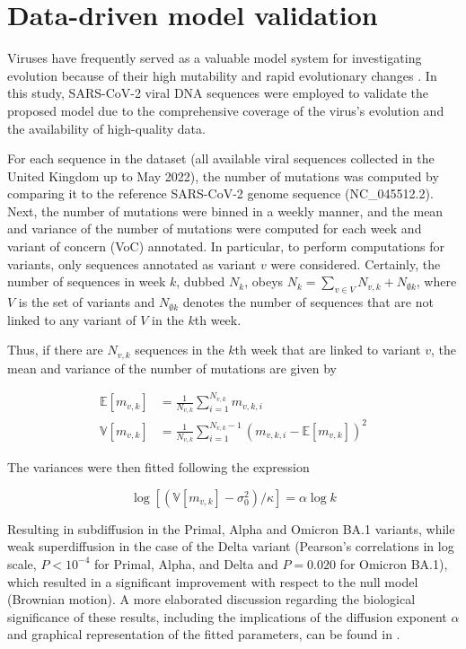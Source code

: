 \documentclass{./LatexTemplate/svproc}
\begin{document}
%
\section{Data-driven model validation}
%

Viruses have frequently served as a valuable model system for investigating evolution because of their high mutability and rapid evolutionary changes \cite{koonin2013}.  In this study, SARS-CoV-2 viral DNA sequences were employed to validate the proposed model due to the comprehensive coverage of the virus's evolution and the availability of high-quality data.

For each sequence in the dataset (all available viral sequences collected in the United Kingdom up to May 2022), the number of mutations was computed by comparing it to the reference SARS-CoV-2 genome sequence (NC\_045512.2). Next, the number of mutations were binned in a weekly manner, and the mean and variance of the number of mutations were computed for each week and variant of concern (VoC) annotated. In particular, to perform computations for variants, only sequences annotated as variant $v$ were considered.  Certainly, the number of sequences in week $k$, dubbed $N_k$, obeys $N_k=\sum_{v\in V} N_{v,k} + N_{\emptyset k}$, where $V$ is the set of variants and $N_{\emptyset k}$ denotes the number of sequences that are not linked to any variant of $V$ in the $k$th week.

Thus, if there are $N_{v,k}$ sequences in the $k$th week that are linked to variant $v$, the mean and variance of the number of mutations are given by

\begin{align}
    \mathbb{E}\left[m_{v,k}\right]&=\frac{1}{N_{v,k}}\sum_{i=1}^{N_{v,k}}m_{v,k,i}\\
    \mathbb{V}\left[m_{v,k}\right]&=\frac{1}{N_{v,k}}\sum_{i=1}^{N_{v,k} - 1}\left(m_{v,k,i} - \mathbb{E}\left[m_{v,k}\right]\right)^2
\end{align}

The variances were then fitted following the expression

\begin{equation}
    \log\left[\left(\mathbb{V}\left[m_{v,k}\right] - \sigma_0^2\right)/\kappa\right] = \alpha\log k
\end{equation}

Resulting in subdiffusion in the Primal, Alpha and Omicron BA.1 variants, while weak superdiffusion in the case of the Delta variant (Pearson's correlations in log scale, $P < 10^{-4}$ for Primal, Alpha, and Delta and $P = 0.020$ for Omicron BA.1), which resulted in a significant improvement with respect to the null model (Brownian motion). A more elaborated discussion regarding the biological significance of these results, including the implications of the diffusion exponent $\alpha$ and graphical representation of the fitted parameters, can be found in \cite{goiriz2023}.
\end{document}
